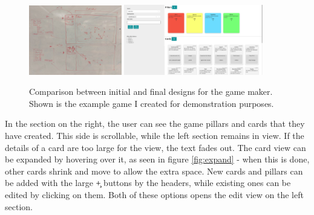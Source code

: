 \begin{figure}[!h]
	\centering
	\includegraphics[width=0.36\textwidth]{./images/design/game_maker_drawing.png}
	\includegraphics[width=0.54\textwidth]{./images/design/game_maker.png}
	\caption{Comparison between initial and final designs for the game maker. Shown is the example game I created for demonstration purposes.}
	\label{fig:game_maker}
\end{figure}

In the section on the right, the user can see the game pillars and cards that they have created. This side is scrollable, while the left section remains in view. If the details of a card are too large for the view, the text fades out. The card view can be expanded by hovering over it, as seen in figure \ref{fig:expand} - when this is done, other cards shrink and move to allow the extra space. New cards and pillars can be added with the large \c{+} buttons by the headers, while existing ones can be edited by clicking on them. Both of these options opens the edit view on the left section.

